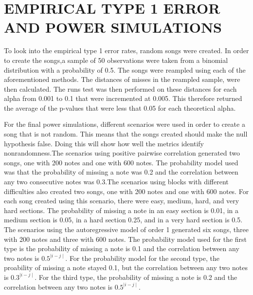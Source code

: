 \documentclass[12pt, letterpaper]{article}
\begin{document}
\section{EMPIRICAL TYPE 1 ERROR AND POWER SIMULATIONS}
To look into the empirical type 1 error rates, random songs were created. In order to create the songs,a sample of 50 observations were taken from a binomial distribution with a probability of 0.5. The songs were reampled using each of the aforementioned methods. The distances of misses in the reampled sample, were then calculated. The runs test was then performed on these distances for each alpha from 0.001 to 0.1 that were incremented at 0.005. This therefore returned the average of the p-values that were less that 0.05 for each theoretical alpha. 

For the final power simulations, different scenarios were used in order to create a song that is not random. This means that the songs created should make the null hypothesis false. Doing this will show how well the metrics identify nonrandomness.The scenarios using positive pairwise correlation generated two songs, one with 200 notes and one with 600 notes. The probability model used was that the probability of missing a note was 0.2 and the correlation between any two consecutive notes was 0.3.The scenarios using blocks with different difficulties also created two songs, one with 200 notes and one with 600 notes. For each song created using this scenario, there were easy, medium, hard, and very hard sections. The probability of missing a note in an easy section is 0.01, in a medium section is 0.05, in a hard section 0.25, and in a very hard section is 0.5. The scenarios using the autoregressive model of order 1 generated six songs, three with 200 notes and three with 600 notes. The probability model used for the first type is the probability of missing a note is 0.1 and the correlation between any two notes is $0.5^{\mid i-j \mid}$. For the probability model for the second type, the proability of missing a note stayed 0.1, but the correlation between any two notes is $0.3^{\mid i-j \mid}$. For the third type, the probability of missing a note is 0.2 and the correlation between any two notes is $0.5^{\mid i-j \mid}$.
\end{document}

